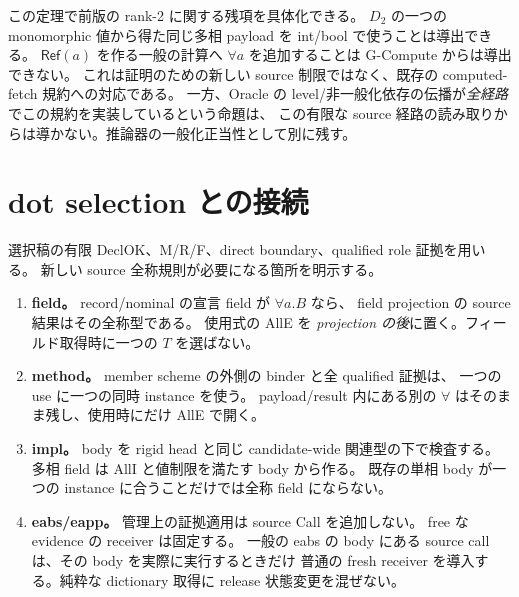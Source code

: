 \documentclass[11pt,a4paper]{article}
\begin{document}
この定理で前版の rank-2 に関する残項を具体化できる。
\(D_2\) の一つの monomorphic 値から得た同じ多相 payload を int/bool で使うことは導出できる。
\(\mathsf{Ref}(a)\) を作る一般の計算へ \(\forall a\) を追加することは G-Compute からは導出できない。
これは証明のための新しい source 制限ではなく、既存の computed-fetch 規約への対応である。
一方、Oracle の level/非一般化依存の伝播が\emph{全経路}でこの規約を実装しているという命題は、
この有限な source 経路の読み取りからは導かない。推論器の一般化正当性として別に残す。

\section{dot selection との接続}
\label{sec:selection}

選択稿の有限 DeclOK、M/R/F、direct boundary、qualified role 証拠を用いる。
新しい source 全称規則が必要になる箇所を明示する。
\begin{enumerate}
\item \textbf{field。} record/nominal の宣言 field が \(\forall a.B\) なら、
field projection の source 結果はその全称型である。
使用式の AllE を \emph{projection の後}に置く。フィールド取得時に一つの \(T\) を選ばない。
\item \textbf{method。} member scheme の外側の binder と全 qualified 証拠は、
一つの use に一つの同時 instance を使う。
payload/result 内にある別の \(\forall\) はそのまま残し、使用時にだけ AllE で開く。
\item \textbf{impl。} body を rigid head と同じ candidate-wide 関連型の下で検査する。
多相 field は AllI と値制限を満たす body から作る。
既存の単相 body が一つの instance に合うことだけでは全称 field にならない。
\item \textbf{eabs/eapp。} 管理上の証拠適用は source Call を追加しない。
free な evidence の receiver は固定する。
一般の eabs の body にある source call は、その body を実際に実行するときだけ
普通の fresh receiver を導入する。純粋な dictionary 取得に release 状態変更を混ぜない。
\end{enumerate}
\end{document}

